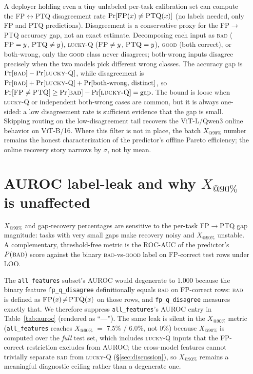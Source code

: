\documentclass{article}
\makeatletter
\newcommand{\fp}{\textsc{FP}\xspace}
\newcommand{\ptq}{\textsc{PTQ}\xspace}
\newcommand{\good}{\textsc{good}\xspace}
\newcommand{\bad}{\textsc{bad}\xspace}
\newcommand{\luckyq}{\textsc{lucky-Q}\xspace}
\newcommand{\xat}[1]{\ensuremath{X_{@#1\%}}}
\makeatother
\begin{document}
A deployer holding even a tiny unlabeled per-task calibration set can compute the \fp{}$\leftrightarrow$\ptq{} disagreement rate $\Pr[\fp(x) \neq \ptq(x)]$ (no labels needed, only FP and PTQ predictions). Disagreement is a conservative proxy for the \fp$\to$\ptq{} accuracy gap, not an exact estimate. Decomposing each input as \bad{} ($\fp=y$, $\ptq\neq y$), \luckyq{} ($\fp\neq y$, $\ptq=y$), \good{} (both correct), or both-wrong, only the \good{} class never disagrees; both-wrong inputs disagree precisely when the two models pick different wrong classes. The accuracy gap is $\Pr[\bad] - \Pr[\luckyq]$, while disagreement is $\Pr[\bad] + \Pr[\luckyq] + \Pr[\text{both-wrong, distinct}]$, so $\Pr[\fp \neq \ptq] \geq \Pr[\bad] - \Pr[\luckyq] = \text{gap}$. The bound is loose when \luckyq{} or independent both-wrong cases are common, but it is always one-sided: a low disagreement rate is sufficient evidence that the gap is small. Skipping routing on the low-disagreement tail recovers the ViT-L/Qwen3 online behavior on ViT-B/16. Where this filter is not in place, the batch \xat{90} number remains the honest characterization of the predictor's offline Pareto efficiency; the online recovery story narrows by $\sigma$, not by mean.

\section{AUROC label-leak and why \xat{90} is unaffected}\label{app:auroc_leak}

\xat{90} and gap-recovery percentages are sensitive to the per-task \fp$\to$\ptq{} gap magnitude: tasks with very small gaps make recovery noisy and \xat{90} unstable. A complementary, threshold-free metric is the ROC-AUC of the predictor's $P(\bad)$ score against the binary \bad{}-vs-\good{} label on FP-correct test rows under LOO.

The \texttt{all\_features} subset's AUROC would degenerate to 1.000 because the binary feature \texttt{fp\_q\_disagree} definitionally equals \bad{} on FP-correct rows: \bad{} is defined as $\fp(x)\!\neq\!\ptq(x)$ on those rows, and \texttt{fp\_q\_disagree} measures exactly that. We therefore suppress \texttt{all\_features}'s AUROC entry in Table~\ref{tab:auroc} (rendered as ``---''). The same leak is silent in the \xat{90} metric (\texttt{all\_features} reaches \xat{90} $=$ 7.5\% / 6.0\%, not 0\%) because \xat{90} is computed over the \emph{full} test set, which includes \luckyq{} inputs that the FP-correct restriction excludes from AUROC; the cross-model features cannot trivially separate \bad{} from \luckyq{} (\S\ref{sec:discussion}), so \xat{90} remains a meaningful diagnostic ceiling rather than a degenerate one.
\end{document}
